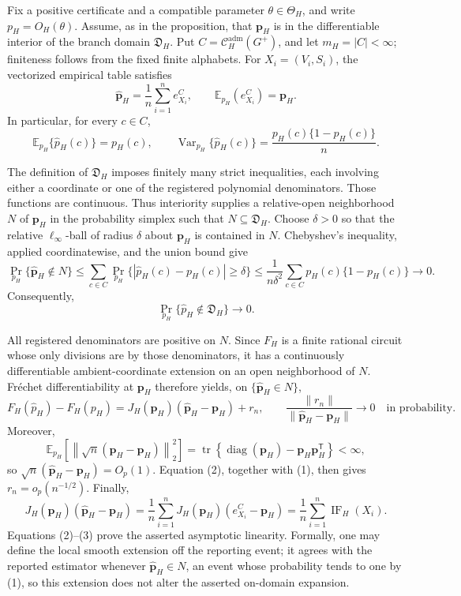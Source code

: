 Fix a positive certificate and a compatible parameter \(\theta\in\Theta_H\), and write \(p_H=O_H(\theta)\).  Assume, as in the proposition, that \(\mathbf p_H\) is in the differentiable interior of the branch domain \(\mathfrak D_H\).  Put \(C=\mathcal C_H^{\mathrm{adm}}(G^+)\), and let \(m_H=|C|<\infty\); finiteness follows from the fixed finite alphabets.  For \(X_i=(V_i,S_i)\), the vectorized empirical table satisfies
\[
 \widehat{\mathbf p}_H=\frac1n\sum_{i=1}^n e_{X_i}^C,
 \qquad
 \mathbb E_{p_H}(e_{X_i}^C)=\mathbf p_H.
\]
In particular, for every \(c\in C\),
\[
 \mathbb E_{p_H}\{\widehat p_H(c)\}=p_H(c),
 \qquad
 \operatorname{Var}_{p_H}\{\widehat p_H(c)\}
 =\frac{p_H(c)\{1-p_H(c)\}}{n}.
\]

The definition of \(\mathfrak D_H\) imposes finitely many strict inequalities, each involving either a coordinate or one of the registered polynomial denominators.  Those functions are continuous.  Thus interiority supplies a relative-open neighborhood \(N\) of \(\mathbf p_H\) in the probability simplex such that \(N\subseteq\mathfrak D_H\).  Choose \(\delta>0\) so that the relative \(\ell_\infty\)-ball of radius \(\delta\) about \(\mathbf p_H\) is contained in \(N\).  Chebyshev's inequality, applied coordinatewise, and the union bound give
\[
 \Pr_{p_H}\{\widehat{\mathbf p}_H\notin N\}
 \leq
 \sum_{c\in C}
 \Pr_{p_H}\{|\widehat p_H(c)-p_H(c)|\geq\delta\}
 \leq
 \frac{1}{n\delta^2}\sum_{c\in C}p_H(c)\{1-p_H(c)\}
 \longrightarrow 0.
\]
Consequently,
\[
 \Pr_{p_H}\{\widehat p_H\notin\mathfrak D_H\}\longrightarrow0. \tag{1}
\]

All registered denominators are positive on \(N\).  Since \(F_H\) is a finite rational circuit whose only divisions are by those denominators, it has a continuously differentiable ambient-coordinate extension on an open neighborhood of \(N\).  Fr\'{e}chet differentiability at \(\mathbf p_H\) therefore yields, on \(\{\widehat{\mathbf p}_H\in N\}\),
\[
 F_H(\widehat p_H)-F_H(p_H)
 =J_H(\mathbf p_H)(\widehat{\mathbf p}_H-\mathbf p_H)+r_n,
 \qquad
 \frac{\|r_n\|}{\|\widehat{\mathbf p}_H-\mathbf p_H\|}\longrightarrow0
 \quad\text{in probability}. \tag{2}
\]
Moreover,
\[
 \mathbb E_{p_H}\!\left[\left\|\sqrt n
 (\widehat{\mathbf p}_H-\mathbf p_H)\right\|_2^2\right]
 =\operatorname{tr}\!\left\{\operatorname{diag}(\mathbf p_H)
 -\mathbf p_H\mathbf p_H^{\mathsf T}\right\}<\infty,
\]
so \(\sqrt n(\widehat{\mathbf p}_H-\mathbf p_H)=O_p(1)\).  Equation (2), together with (1), then gives \(r_n=o_p(n^{-1/2})\).  Finally,
\[
 J_H(\mathbf p_H)(\widehat{\mathbf p}_H-\mathbf p_H)
 =\frac1n\sum_{i=1}^n
 J_H(\mathbf p_H)(e_{X_i}^C-\mathbf p_H)
 =\frac1n\sum_{i=1}^n\operatorname{IF}_H(X_i). \tag{3}
\]
Equations (2)--(3) prove the asserted asymptotic linearity.  Formally, one may define the local smooth extension off the reporting event; it agrees with the reported estimator whenever \(\widehat{\mathbf p}_H\in N\), an event whose probability tends to one by (1), so this extension does not alter the asserted on-domain expansion.

